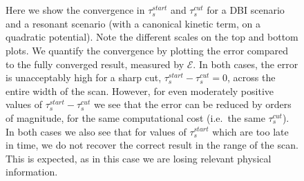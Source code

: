 \begin{figure}[!pth]
\centering
    \\
    \\
\caption{
    Here we show the convergence in $\tau_s^{start}$ and $\tau_s^{cut}$ for a DBI scenario and a resonant scenario
    (with a canonical kinetic term, on a quadratic potential).
    Note the different scales on the top and bottom plots.
    We quantify the convergence by plotting the error compared to the fully converged result,
    measured by $\mathcal{E}$.
    In both cases, the error is unacceptably high for a sharp cut, $\tau_s^{start}-\tau_s^{cut}=0$,
    across the entire width of the scan. However, for even moderately positive values of $\tau_s^{start}-\tau_s^{cut}$
    we see that the error can be reduced by orders of magnitude, for the same computational cost
    (i.e.\ the same $\tau_s^{cut}$).
    In both cases we also see that for values of $\tau_s^{start}$ which are too late in time,
    we do not recover the correct result in the range of the scan. This is expected,
    as in this case we are losing relevant physical information.
    }\label{fig:plot_time_integrand_scan}
\end{figure}


